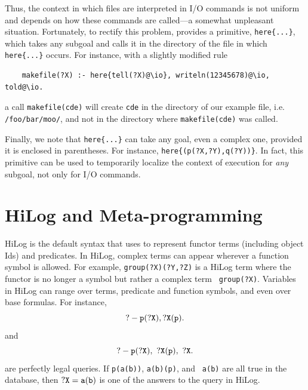 \documentclass[11pt]{article}
\newcommand{\ERGO}{\mbox{\smaller{\ensuremath{\cal{E}}\smaller{{\sc{RGO}}}}}\xspace}
\newcommand{\FLSYSTEM}{\ERGO}
\begin{document}
Thus, the context in which files are interpreted in I/O commands is not
uniform and depends on how these commands are called---a somewhat
unpleasant situation. Fortunately, to rectify this problem, \FLSYSTEM
provides a primitive, \texttt{here\{...\}}, which takes any subgoal and
calls it in the directory of the file in which \texttt{here\{...\}} occurs.
For instance, with a slightly modified rule
\begin{verbatim}
    makefile(?X) :- here{tell(?X)@\io}, writeln(12345678)@\io, told@\io.
\end{verbatim}
a call \texttt{makefile(cde)} will create \texttt{cde} in the directory of
our example file, i.e. \texttt{/foo/bar/moo/}, and not in the directory where 
\texttt{makefile(cde)} was called. 

Finally, we note that \texttt{here\{...\}} can take any goal, even a
complex one, provided it is enclosed in parentheses. For instance,
\texttt{here\{(p(?X,?Y),q(?Y))\}}. In fact, this primitive can be used to
temporarily localize the context of execution for \emph{any} subgoal, not
only for I/O commands.




\section{HiLog and Meta-programming} \label{sec:hilog}


%
HiLog \cite{hilog-jlp} is the default syntax that \FLSYSTEM uses to
represent functor terms (including object Ids) and predicates.  In
HiLog, complex terms can appear wherever a function symbol is
allowed. For example, {\tt group(?X)(?Y,?Z)} is a HiLog term where the
functor is no longer a symbol but rather a complex term {\tt
group(?X)}. Variables in HiLog can range over terms, predicate and
function symbols, and even over base formulas. For instance,
\[
{\tt
 ?- p(?X), ?X(p).
}
\]
\noindent
and
\begin{equation}\label{eq-hilog-notallowed}
{\tt
 ?- p(?X), ~?X(p), ~?X.  
}
\end{equation}
\noindent
are perfectly legal queries. If {\tt p(a(b))}, {\tt a(b)(p)}, and {\tt
a(b)} are all true in the database, then $\tt ?X=a(b)$ is one of the answers
to the query in HiLog.

\end{document}
